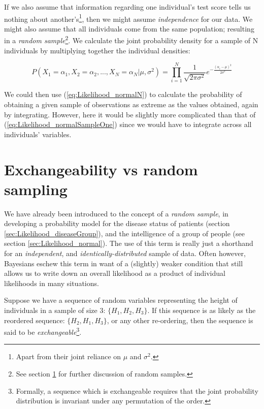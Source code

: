 \documentclass[11pt,fullpage]{book}
\begin{document}
If we also assume that information regarding one individual's test score tells us nothing about another's\footnote{Apart from their joint reliance on $\mu$ and $\sigma^2$.}, then we might assume \textit{independence} for our data. We might also assume that all individuals come from the same population; resulting in a \textit{random sample}\footnote{See section \ref{sec:Likelihood_randomSampleExchangeable} for further discussion of random samples.}. We calculate the joint probability density for a sample of N individuals by multiplying together the individual densities:


\begin{equation}
P(X_1=\alpha_1,X_2 =\alpha_2,...,X_N=\alpha_N|\mu,\sigma^2) = \prod\limits_{i=1}^{N}\frac{1}{\sqrt{2\pi\sigma^2}}e^{-\frac{(\alpha_i-\mu)^2}{2\sigma^2}}
\end{equation}\label{eq:Likelihood_normalN}


We could then use (\ref{eq:Likelihood_normalN}) to calculate the probability of obtaining a given sample of observations as extreme as the values obtained, again by integrating. However, here it would be slightly more complicated than that of (\ref{eq:Likelihood_normalSampleOne}) since we would have to integrate across all individuals' variables.

\section{Exchangeability vs random sampling}\label{sec:Likelihood_randomSampleExchangeable}
We have already been introduced to the concept of a \textit{random sample}, in developing a probability model for the disease status of patients (section \ref{sec:Likelihood_diseaseGroup}), and the intelligence of a group of people (see section \ref{sec:Likelihood_normal}). The use of this term is really just a shorthand for an \textit{independent}, and \textit{identically-distributed} sample of data. Often however, Bayesians eschew this term in want of a (slightly) weaker condition that still allows us to write down an overall likelihood as a product of individual likelihoods in many situations. 

Suppose we have a sequence of random variables representing the height of individuals in a sample of size 3: $\{H_1,H_2,H_3\}$. If this sequence is as likely as the reordered sequence: $\{H_2,H_1,H_3\}$, or any other re-ordering, then the sequence is said to be \textit{exchangeable}\footnote{Formally, a sequence which is exchangeable requires that the joint probability distribution is invariant under any permutation of the order.}.
\end{document}
